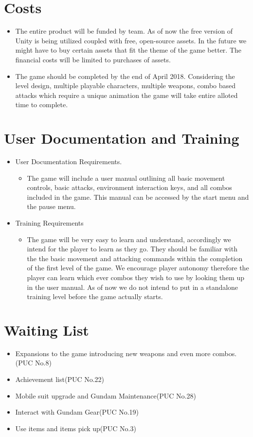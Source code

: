 \documentclass{article}
\begin{document}
\section{Costs}
\begin{itemize}
  \item The entire product will be funded by team. As of now the free version of Unity is being utilized coupled with free, open-source assets. In the future we might have to buy certain assets that fit the theme of the game better. The financial costs will be limited to purchases of assets.  
  \item The game should be completed by the end of April 2018. Considering the level design, multiple playable characters, multiple weapons, combo based attacks which require a unique animation the game will take entire alloted time to complete. 
\end{itemize}

\section{User Documentation and Training}
\begin{itemize}
  \item User Documentation Requirements.
  \begin{itemize}
    \item The game will include a user manual outlining all basic movement controls, basic attacks, environment interaction keys, and all combos included in the game. This manual can be accessed by the start menu and the pause menu.
  \end{itemize}
  \item Training Requirements
    \begin{itemize}
        \item The game will be very easy to learn and understand, accordingly we intend for the player to learn as they go. They should be familiar with the the basic movement and attacking commands within the completion of the first level of the game. We encourage player autonomy therefore the player can learn which ever combos they wish to use by looking them up in the user manual. As of now we do not intend to put in a standalone training level before the game actually starts. 
  \end{itemize}
\end{itemize}

\section{Waiting List}
\begin{itemize}
  \item Expansions to the game introducing new weapons and even more combos.(PUC No.8)
  \item Achievement list(PUC No.22)
  \item Mobile suit upgrade and Gundam Maintenance(PUC No.28)
  \item Interact with Gundam Gear(PUC No.19)
  \item Use items and items pick up(PUC No.3)
\end{itemize}
\end{document}
